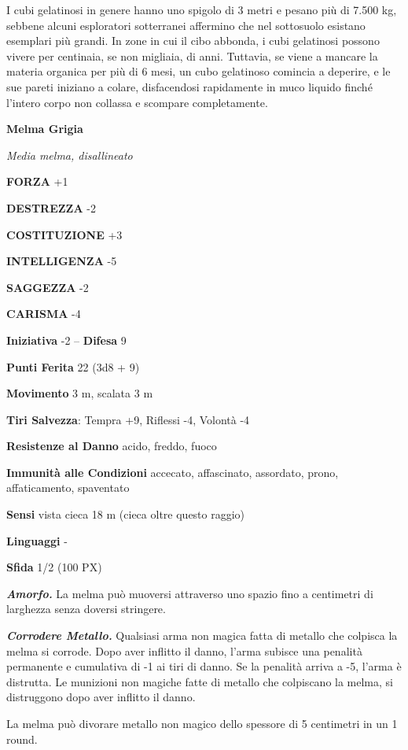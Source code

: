 \begin{multicols}{2}
I cubi gelatinosi in genere hanno uno spigolo di 3 metri e pesano più di 7.500 kg, sebbene alcuni esploratori sotterranei affermino che nel sottosuolo esistano esemplari più grandi. In zone in cui il cibo abbonda, i cubi gelatinosi possono vivere per centinaia, se non migliaia, di anni. Tuttavia, se viene a mancare la materia organica per più di 6 mesi, un cubo gelatinoso comincia a deperire, e le sue pareti iniziano a colare, disfacendosi rapidamente in muco liquido finché l'intero corpo non collassa e scompare completamente.


\medskip{}\textbf{Melma Grigia}

\textit{Media melma, disallineato}

\textbf{FORZA} +1

\textbf{DESTREZZA} -2

\textbf{COSTITUZIONE} +3

\textbf{INTELLIGENZA} -5

\textbf{SAGGEZZA} -2

\textbf{CARISMA} -4

\textbf{Iniziativa} -2 -- \textbf{Difesa} 9

\textbf{Punti Ferita} 22 (3d8 + 9)

\textbf{Movimento} 3 m, scalata 3 m

\textbf{Tiri Salvezza}: Tempra +9, Riflessi -4, Volontà -4

\textbf{Resistenze al Danno} acido, freddo, fuoco

\textbf{Immunità alle Condizioni} accecato, affascinato, assordato, prono, affaticamento, spaventato

\textbf{Sensi} vista cieca 18 m (cieca oltre questo raggio)

\textbf{Linguaggi} -

\textbf{Sfida} 1/2 (100 PX)

\textit{\textbf{Amorfo.}} La melma può muoversi attraverso uno spazio fino a centimetri di larghezza senza doversi stringere.

\textit{\textbf{Corrodere Metallo.}} Qualsiasi arma non magica fatta di metallo che colpisca la melma si corrode. Dopo aver inflitto il danno, l'arma subisce una penalità permanente e cumulativa di -1 ai tiri di danno. Se la penalità arriva a -5, l'arma è distrutta. Le munizioni non magiche fatte di metallo che colpiscano la melma, si distruggono dopo aver inflitto il danno.

La melma può divorare metallo non magico dello spessore di 5 centimetri in un 1 round.


\end{multicols}
